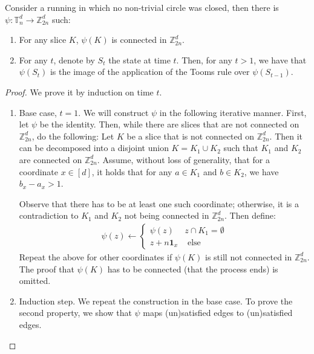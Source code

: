 \begin{claim}
  \label{claim:toZ2}
  Consider a running in which no non-trivial circle was closed, then there is $\psi \colon \mathbb{T}^{d}_{n} \rightarrow \mathbb{Z}_{2n}^{d}$ such:
  \begin{enumerate}
    \item For any slice $K$, $\psi(K)$ is connected in $\mathbb{Z}_{2n}^{d}$.
    \item For any $t$, denote by $S_{t}$ the state at time $t$. Then, for any $t > 1$, we have that $\psi(S_{t})$ is the image of the application of the Tooms rule over $\psi(S_{t-1})$.
  \end{enumerate}
\end{claim}
\begin{proof}
  We prove it by induction on time $t$.
  \begin{enumerate}
    \item Base case, $t=1$. We will construct $\psi$ in the following iterative manner. First, let $\psi$ be the identity. Then, while there are slices that are not connected on $\mathbb{Z}_{2n}^{d}$, do the following: Let $K$ be a slice that is not connected on $\mathbb{Z}_{2n}^{d}$. Then it can be decomposed into a disjoint union $K= K_{1} \cup K_{2}$ such that $K_{1}$ and $K_{2}$ are connected on $\mathbb{Z}_{2n}^{d}$. Assume, without loss of generality, that for a coordinate $x \in [d]$, it holds that for any $a \in K_{1}$ and $b \in K_{2}$, we have $b_{x} - a_{x} > 1$. 

Observe that there has to be at least one such coordinate; otherwise, it is a contradiction to $K_{1}$ and $K_{2}$ not being connected in $\mathbb{Z}_{2n}^{d}$. Then define:
      \begin{equation*}
        \begin{split}
          \psi(z) \leftarrow 
          \begin{cases}
            \psi(z) & z \cap K_{1} = \emptyset \\ 
            z + n \mathbf{1}_{x} & \text{ else }
          \end{cases}
        \end{split}
      \end{equation*}
Repeat the above for other coordinates if $\psi(K)$ is still not connected in $\mathbb{Z}_{2n}^{d}$. The proof that $\psi(K)$ has to be connected (that the process ends) is omitted.
\item Induction step. We repeat the construction in the base case. To prove the second property, we show that $\psi$ maps (un)satisfied edges to (un)satisfied edges. 
  \end{enumerate}

\end{proof}


